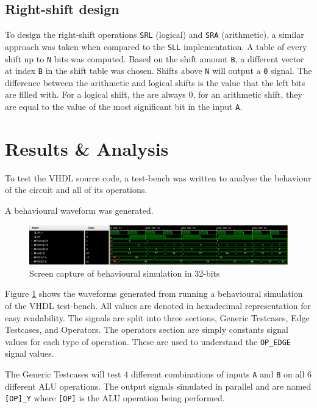 \documentclass[CMPE]{../KGCOEReport}
\def\code#1{\texttt{#1}}
\begin{document}
    \subsection*{Right-shift design}
    To design the right-shift operations \code{SRL} (logical) and \code{SRA} (arithmetic), a similar approach was
    taken when compared to the \code{SLL} implementation.
    A table of every shift up to \code{N} bits was computed.
    Based on the shift amount \code{B}, a different vector at index \code{B} in the shift table was chosen.
    Shifts above \code{N} will output a \code{0} signal.
    The difference between the arithmetic and logical shifts is the value that the left bits are filled with.
    For a logical shift, the are always 0, for an arithmetic shift, they are equal to the value of the most significant
    bit in the input \code{A}.

    \section*{Results \& Analysis}
    To test the VHDL source code, a test-bench was written to analyse the behaviour of the circuit and all of its
    operations.

    A behavioural waveform was generated.

    \begin{figure}[h!]
        \centering
        \includegraphics[width=\textwidth]{img/behaviour}
        \caption{Screen capture of behavioural simulation in 32-bits}
        \label{fig:behave}
    \end{figure}

    Figure \ref{fig:behave} shows the waveforms generated from running a behavioural simulation of the VHDL
    test-bench.
    All values are denoted in hexadecimal representation for easy readability.
    The signals are split into three sections, Generic Testcases, Edge Testcases, and Operators.
    The operators section are simply constants signal values for each type of operation.
    These are used to understand the \code{OP\_EDGE} signal values.

    The Generic Testcases will test 4 different combinations of inputs \code{A} and \code{B} on all 6
    different ALU operations.
    The output signals simulated in parallel and are named \code{[OP]\_Y} where \code{[OP]} is the ALU operation
    being performed.
\end{document}
